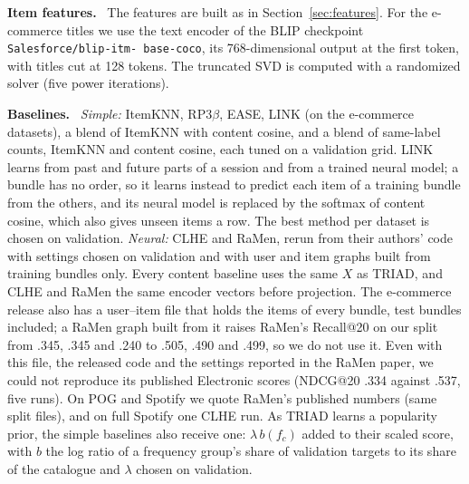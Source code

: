 \documentclass[runningheads]{llncs}
\renewcommand{\paragraph}[1]{\smallskip\noindent\textbf{#1}\ }
\begin{document}
\paragraph{Item features.} The features are built as in Section~\ref{sec:features}. For the e-commerce titles we use
the text encoder of the BLIP checkpoint \texttt{Salesforce/\allowbreak blip-\allowbreak itm-\allowbreak
base-\allowbreak coco}, its 768-dimensional output at the first token, with titles cut at 128 tokens. The truncated
SVD is computed with a randomized solver (five power iterations).

\paragraph{Baselines.} \emph{Simple:} ItemKNN, RP3$\beta$, EASE, LINK \cite{link} (on the e-commerce datasets), a
blend of ItemKNN with content cosine, and a blend of same-label counts, ItemKNN and content cosine, each tuned on a
validation grid. LINK learns from past and future parts of a session and from a trained neural model; a bundle has no
order, so it learns instead to predict each item of a training bundle from the others, and its neural model is
replaced by the softmax of content cosine, which also gives unseen items a row. The best method per dataset is
chosen on validation. \emph{Neural:} CLHE and RaMen, rerun from their authors' code with settings chosen on validation
and with user and item graphs built from training bundles only. Every content baseline uses the same $X$ as TRIAD,
and CLHE and RaMen the same encoder vectors before projection. The e-commerce release also has a user--item file that
holds the items of every bundle, test bundles included; a RaMen graph built from it raises RaMen's Recall@20 on our
split from .345, .345 and .240 to .505, .490 and .499, so we do not use it. Even with this file, the released code
and the settings reported in the RaMen paper, we could not reproduce its published Electronic scores (NDCG@20 .334
against .537, five runs). On POG and Spotify we quote RaMen's
published numbers (same split files), and on full Spotify one CLHE run. As TRIAD learns a popularity prior, the
simple baselines also receive one: $\lambda\,b(f_c)$ added to their scaled score, with $b$ the log ratio of a
frequency group's share of validation targets to its share of the catalogue and $\lambda$ chosen on validation.
\end{document}
